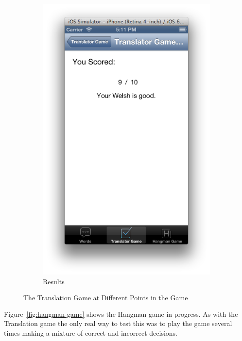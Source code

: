 \documentclass[11pt, a4paper]{article}
\begin{document}
\begin{figure}[h]
\begin{subfigure}[b]{0.3\textwidth}
\includegraphics[width=\textwidth]{img/trans-game-results}
\caption{Results}
\end{subfigure}
\caption{The Translation Game at Different Points in the Game}
\label{fig:trans-game}
\end{figure}

Figure~\ref{fig:hangman-game} shows the Hangman game in progress. As with the Translation game the only real way to test this was to play the game several times making a mixture of correct and incorrect decisions.
\end{document}
